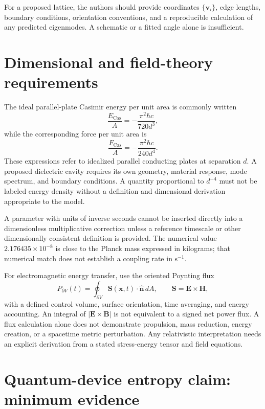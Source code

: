 \documentclass[aps,preprint,superscriptaddress,longbibliography]{revtex4-2}
\begin{document}
For a proposed lattice, the authors should provide coordinates
$\{\mathbf{v}_i\}$, edge lengths, boundary conditions, orientation
conventions, and a reproducible calculation of any predicted eigenmodes.
A schematic or a fitted angle alone is insufficient.

\section{Dimensional and field-theory requirements}

The ideal parallel-plate Casimir energy per unit area is commonly written
\begin{equation}
\frac{E_{\mathrm{Cas}}}{A}
= -\frac{\pi^2\hbar c}{720d^3},
\end{equation}
while the corresponding force per unit area is
\begin{equation}
\frac{F_{\mathrm{Cas}}}{A}
= -\frac{\pi^2\hbar c}{240d^4}.
\end{equation}
These expressions refer to idealized parallel conducting plates at
separation $d$. A proposed dielectric cavity requires its own geometry,
material response, mode spectrum, and boundary conditions. A quantity
proportional to $d^{-4}$ must not be labeled energy density without a
definition and dimensional derivation appropriate to the model.

A parameter with units of inverse seconds cannot be inserted directly into
a dimensionless multiplicative correction unless a reference timescale or
other dimensionally consistent definition is provided. The numerical value
$2.176435\times10^{-8}$ is close to the Planck mass expressed in kilograms;
that numerical match does not establish a coupling rate in
$\mathrm{s}^{-1}$.

For electromagnetic energy transfer, use the oriented Poynting flux
\begin{equation}
P_{\partial V}(t)=\oint_{\partial V}
\mathbf{S}(\mathbf{x},t)\cdot\hat{\mathbf{n}}\,dA,
\qquad
\mathbf{S}=\mathbf{E}\times\mathbf{H},
\end{equation}
with a defined control volume, surface orientation, time averaging, and
energy accounting. An integral of $|\mathbf{E}\times\mathbf{B}|$ is not
equivalent to a signed net power flux. A flux calculation alone does not
demonstrate propulsion, mass reduction, energy creation, or a spacetime
metric perturbation. Any relativistic interpretation needs an explicit
derivation from a stated stress-energy tensor and field equations.

\section{Quantum-device entropy claim: minimum evidence}
\end{document}
